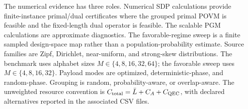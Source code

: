 The numerical evidence has three roles. Numerical SDP calculations provide finite-instance primal/dual certificates where the grouped primal POVM is feasible and the fixed-length dual operator is feasible. The scalable PGM calculations are approximate diagnostics. The favorable-regime sweep is a finite sampled design-space map rather than a population-probability estimate. Source families are Zipf, Dirichlet, near-uniform, and strong-skew distributions. The benchmark uses alphabet sizes $M\in\{4,8,16,32,64\}$; the favorable sweep uses $M\in\{4,8,16,32\}$. Payload modes are optimized, deterministic-phase, and random-phase. Grouping is random, probability-aware, or overlap-aware. The unweighted resource convention is $C_{\rm total}=\bar L+C_A+C_{\rm QEC}$, with declared alternatives reported in the associated CSV files.

